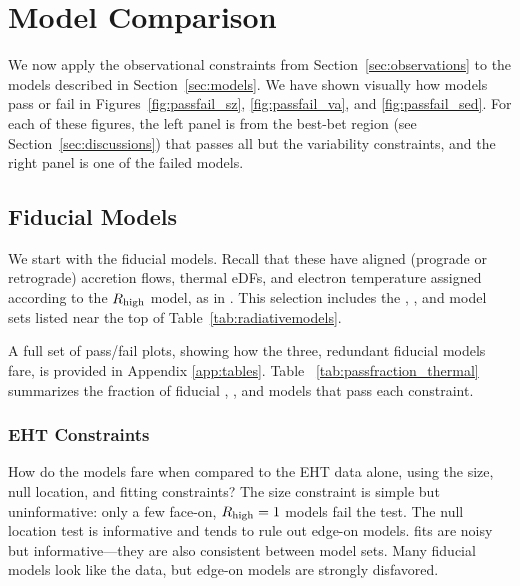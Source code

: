 \section{Model Comparison}\label{sec:comparisons}

We now apply the observational constraints from Section~\ref{sec:observations} to the models described in Section~\ref{sec:models}.  We have shown visually how models pass or fail in Figures~\ref{fig:passfail_sz}, \ref{fig:passfail_va}, and \ref{fig:passfail_sed}.  For each of these figures, the left panel is from the best-bet region (see Section~\ref{sec:discussions}) that passes all but the variability constraints, and the right panel is one of the failed models.

\subsection{Fiducial Models}\label{subsec:thermal}

We start with the fiducial models.  Recall that these have aligned (prograde or retrograde) accretion flows, thermal eDFs, and electron temperature assigned according to the $R_\mathrm{high}$ model, as in .  This selection includes the \kharma, \bhac, and \hamr model sets listed near the top of Table~\ref{tab:radiativemodels}.  

A full set of pass/fail plots, showing how the three, redundant fiducial models fare, is provided in Appendix \ref{app:tables}. Table ~\ref{tab:passfraction_thermal} summarizes the fraction of fiducial \kharma, \bhac, and \hamr models that pass each constraint. 



\subsubsection{EHT Constraints}

How do the models fare when compared to the EHT data alone, using the size, null location, and \mring fitting constraints?  The size constraint is simple but uninformative: only a few face-on, $R_\mathrm{high} = 1$ models fail the test.  The null location test is informative and tends to rule out edge-on models.  \Mring fits are noisy but informative---they are also consistent between model sets.  Many fiducial models look like the data, but edge-on models are strongly disfavored.


